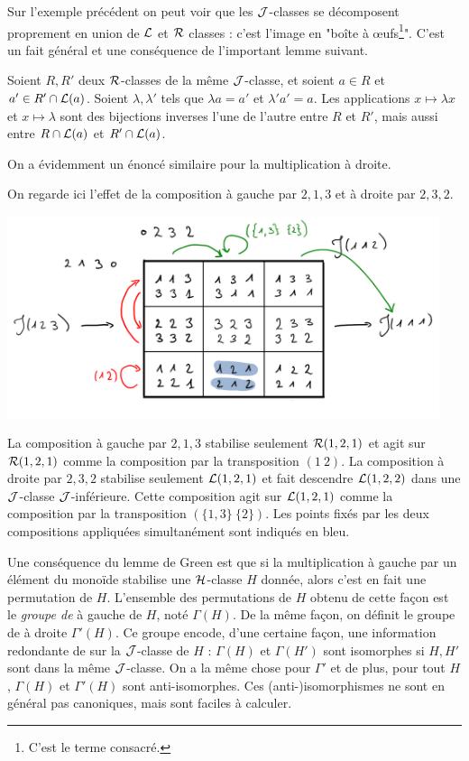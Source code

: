 \documentclass{article}
\begin{document}
	Sur l'exemple précédent on peut voir que les $\mathcal{J}$-classes se décomposent proprement en union de $\mathcal{L}$ et $\mathcal{R}$ classes : c'est l'image en "boîte à \oe{}ufs\footnote{C'est le terme consacré.}". C'est un fait général et une conséquence de l'important lemme suivant.
	
	\begin{lemme}
		Soient $R, R'$ deux $\mathcal{R}$-classes de la même $\mathcal{J}$-classe, et soient $a \in R$ et $a' \in R' \cap \mathcal{L}(a)$. Soient $\lambda, \lambda'$ tels que $\lambda a = a'$ et $\lambda' a' = a$. Les applications $x \mapsto \lambda x$ et $x \mapsto \lambda$ sont des bijections inverses l'une de l'autre entre $R$ et $R'$, mais aussi entre $R \cap \mathcal{L}(a)$ et $R' \cap \mathcal{L}(a)$.
	\end{lemme}

	On a évidemment un énoncé similaire pour la multiplication à droite. 
	
	\begin{lined}
		\begin{ex}
		On regarde ici l'effet de la composition à gauche par $2,1,3$ et à droite par $2,3,2$.
		
		{\centering
		\includegraphics[width=0.95\textwidth]{./green.png}}
	
		La composition à gauche par $2,1,3$ stabilise seulement $\mathcal{R}(1, 2, 1)$ et agit sur $\mathcal{R}(1, 2, 1)$ comme la composition par la transposition $(1\ 2)$.
		La composition à droite par $2, 3, 2$ stabilise seulement $\mathcal{L}(1, 2, 1)$ et fait descendre $\mathcal{L}(1, 2, 2)$ dans une $\mathcal{J}$-classe $\mathcal{J}$-inférieure. Cette composition agit sur $\mathcal{L}(1, 2, 1)$ comme la composition par la transposition $(\{1, 3\}\ \{2\})$. Les points fixés par les deux compositions appliquées simultanément sont indiqués en bleu.
		\end{ex}
	\end{lined}

	Une conséquence du lemme de Green est que si la multiplication à gauche par un élément du monoïde stabilise une $\mathcal{H}$-classe $H$ donnée, alors c'est en fait une permutation de $H$. L'ensemble des permutations de $H$ obtenu de cette façon est le \emph{groupe de \schu} à gauche de $H$, noté $\Gamma(H)$. De la même façon, on définit le groupe de \schu à droite $\Gamma'(H)$. Ce groupe encode, d'une certaine façon, une information redondante de sur la $\mathcal{J}$-classe de $H$ : $\Gamma(H)$ et $\Gamma(H')$ sont isomorphes si $H, H'$ sont dans la même $\mathcal{J}$-classe. On a la même chose pour $\Gamma'$ et de plus, pour tout $H$, $\Gamma(H)$ et $\Gamma'(H)$ sont anti-isomorphes. Ces (anti-)isomorphismes ne sont en général pas canoniques, mais sont faciles à calculer.
	
\end{document}
